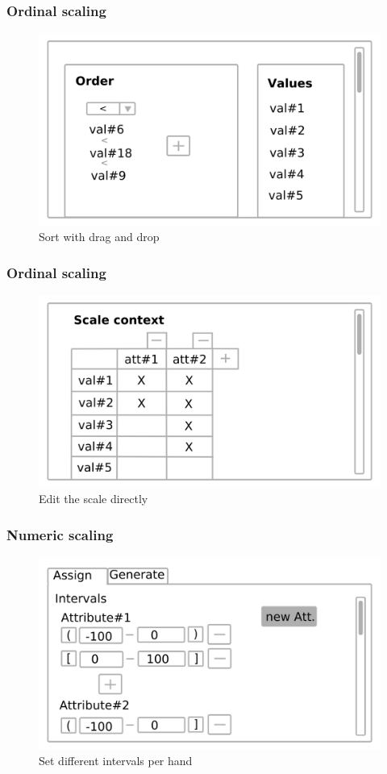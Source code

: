\documentclass[]{beamer}
\begin{document}
	\begin{frame}
		\frametitle{Ordinal scaling}
		\begin{figure}[H]
			\includegraphics[width=\linewidth]{../mock_up/ord-2.png}
			\caption{Sort with drag and drop}
			\label{fig:p1}
		\end{figure}
	\end{frame}

	\begin{frame}
		\frametitle{Ordinal scaling}
		\begin{figure}[H]
			\includegraphics[width=\linewidth]{../mock_up/ord-1.png}
			\caption{Edit the scale directly}
			\label{fig:p1}
		\end{figure}
	\end{frame}

	\begin{frame}
		\frametitle{Numeric scaling}
		\begin{figure}[H]
			\includegraphics[width=\linewidth]{../mock_up/num.png}
			\caption{Set different intervals per hand}
			\label{fig:p1}
		\end{figure}
	\end{frame}
\end{document}
